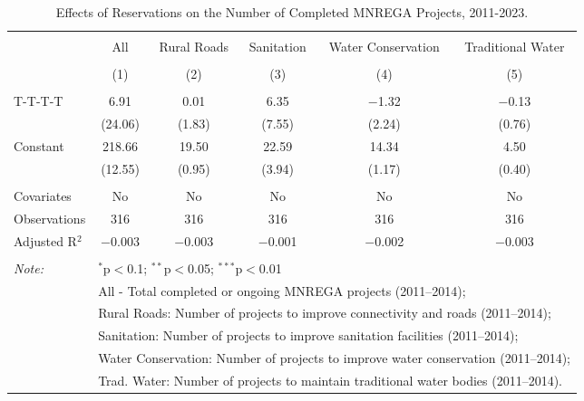 
\begin{table}[!htbp] \centering 
  \caption{Effects of Reservations on the Number of Completed MNREGA Projects, 2011-2023.} 
  \label{} 
\begin{tabular}{@{\extracolsep{5pt}}lccccc} 
\\[-1.8ex]\hline 
\hline \\[-1.8ex] 
 & All & Rural Roads & Sanitation & Water Conservation & Traditional Water \\ 
\\[-1.8ex] & (1) & (2) & (3) & (4) & (5)\\ 
\hline \\[-1.8ex] 
 T-T-T-T & 6.91 & 0.01 & 6.35 & $-$1.32 & $-$0.13 \\ 
  & (24.06) & (1.83) & (7.55) & (2.24) & (0.76) \\ 
  Constant & 218.66 & 19.50 & 22.59 & 14.34 & 4.50 \\ 
  & (12.55) & (0.95) & (3.94) & (1.17) & (0.40) \\ 
 \hline \\[-1.8ex] 
Covariates & No & No & No & No & No \\ 
Observations & 316 & 316 & 316 & 316 & 316 \\ 
Adjusted R$^{2}$ & $-$0.003 & $-$0.003 & $-$0.001 & $-$0.002 & $-$0.003 \\ 
\hline 
\hline \\[-1.8ex] 
\textit{Note:}  & \multicolumn{5}{l}{$^{*}$p$<$0.1; $^{**}$p$<$0.05; $^{***}$p$<$0.01} \\ 
 & \multicolumn{5}{l}{All - Total completed or ongoing MNREGA projects (2011--2014);} \\ 
 & \multicolumn{5}{l}{Rural Roads: Number of projects to improve connectivity and roads (2011--2014);} \\ 
 & \multicolumn{5}{l}{Sanitation:  Number of projects to improve sanitation facilities  (2011--2014);} \\ 
 & \multicolumn{5}{l}{Water Conservation: Number of projects to improve water conservation (2011--2014);} \\ 
 & \multicolumn{5}{l}{Trad. Water: Number of projects to maintain traditional water bodies (2011--2014).} \\ 
\end{tabular} 
\end{table} 
